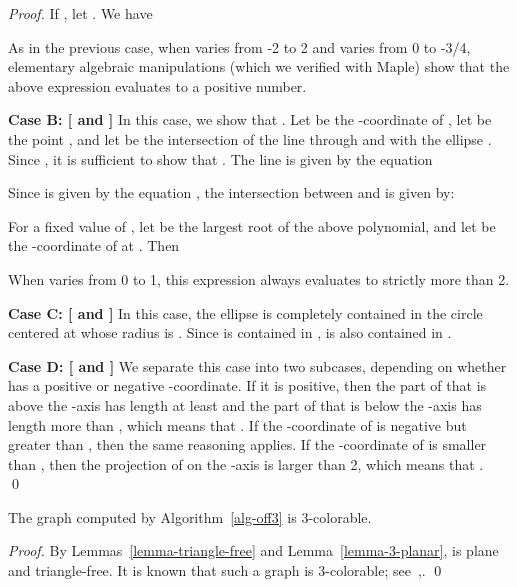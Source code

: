 \documentclass[pdftex,leqno,fleqn,12pts]{llncs}
\begin{document}
\begin{proof}
If , let . We have 
 
As in the previous case, when  varies from -2 to 2 and  varies 
from 0 to -3/4, elementary algebraic manipulations (which we verified with Maple) show that the above expression 
evaluates to a positive number.

\vspace{0.5em} 

\noindent 
\textbf{Case B: [ and ]} In this case, we show that . Let  be 
the -coordinate of , let  be the point , and let 
 be the intersection of the line  through  and  with the 
ellipse . Since , it is sufficient to show that 
. The line  is given by the equation 
 
Since  is given by the equation , the intersection 
between  and  is given by:
 
For a fixed value of , let  be the largest root of the above 
polynomial, and let  be the -coordinate of  at . 
Then
 
When  varies from 0 to 1, this 
expression always evaluates to strictly more than 2. 

\vspace{0.5em} 

\noindent 
\textbf{Case C: [ and ]} In this case, the ellipse  is completely contained 
in the circle  centered at  whose radius is . Since  is 
contained in ,  is also contained in .

\vspace{0.5em} 

\noindent 
\textbf{Case D: [ and ]} We separate this case into two subcases, depending on 
whether  has a positive or negative -coordinate. If it is positive, 
then the part of  that is above the -axis has length 
at least  and the part of  that is below the -axis 
has length more than , which means that . If the 
-coordinate of  is negative but greater than , then the same 
reasoning applies. If the -coordinate of  is smaller than , 
then the projection of  on the -axis is larger than 
2, which means that .
\qed 
\end{proof}

\begin{lemma} \label{lemma-3col} 
The graph  computed by Algorithm~\ref{alg-off3} is 3-colorable.
\end{lemma}
\begin{proof}
By Lemmas~\ref{lemma-triangle-free} and Lemma~\ref{lemma-3-planar},
 is plane and triangle-free. It is known that such a graph is
3-colorable; see~\cite{g3color},\cite{thomassen03}.
\qed 
\end{proof}
\end{document}
